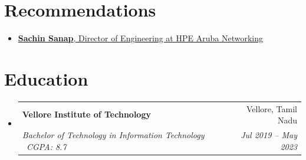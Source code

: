 \documentclass[letterpaper,11pt]{article}
\makeatletter
\newcommand{\resumeSubheading}[4]{
  \vspace{-2pt}\item
    \begin{tabular*}{0.97\textwidth}[t]{l@{\extracolsep{\fill}}r}
      \textbf{#1} & #2 \\
      \textit{\small#3} & \textit{\small #4} \\
    \end{tabular*}\vspace{-7pt}
}
\newcommand{\resumeSubHeadingListStart}{\begin{itemize}[leftmargin=0.15in, label={}]}
\newcommand{\resumeSubHeadingListEnd}{\end{itemize}}
\makeatother
\begin{document}
\section{Recommendations}
\begin{itemize}[leftmargin=0.15in, label={}]
    \item \small{
        \href{https://www.linkedin.com/in/aadimanchekar/details/recommendations}{\textbf{Sachin Sanap}, Director of Engineering at HPE Aruba Networking}
    }
\end{itemize}

\section{Education}
  \resumeSubHeadingListStart
    \resumeSubheading
      {Vellore Institute of Technology}{Vellore, Tamil Nadu}
      {Bachelor of Technology in Information Technology \textbar\ CGPA: 8.7}{Jul 2019 -- May 2023}
  \resumeSubHeadingListEnd

\end{document}
